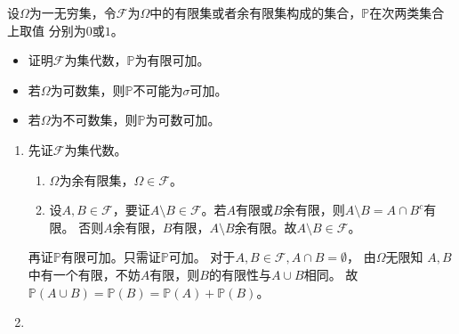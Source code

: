 \documentclass{ctexart}
\begin{document}
\begin{problem}
  设\(\Omega \)为一无穷集，令\(\mathcal{F} \)为\(\Omega \)中的有限集或者余有限集构成的集合，\(\mathbb{P} \)在次两类集合上取值
  分别为\(0 \)或\(1 \)。
  \begin{itemize}
    \item 证明\(\mathcal{F} \)为集代数，\(\mathbb{P} \)为有限可加。
    \item 若\(\Omega \)为可数集，则\(\mathbb{P} \)不可能为\(\sigma \)可加。
    \item 若\(\Omega \)为不可数集，则\(\mathbb{P} \)为可数可加。
  \end{itemize}

\end{problem}
\begin{solution}
  \begin{enumerate}
    \item
      先证\(\mathcal{F} \)为集代数。
      \begin{enumerate}
        \item \(\Omega \)为余有限集，\(\Omega \in \mathcal{F} \)。
        \item 设\(A,B \in \mathcal{F} \)，要证\(A \setminus B \in \mathcal{F} \)。若\(A \)有限或\(B \)余有限，则\(A \setminus B = A \cap B^c \)有限。
          否则\(A \)余有限，\(B \)有限，\(A \setminus B \)余有限。故\(A \setminus B \in \mathcal{F} \)。
      \end{enumerate}
      再证\(\mathbb{P}\)有限可加。只需证\(\mathbb{P} \)可加。
      对于\(A,B \in \mathcal{F},A \cap B = \emptyset \)，
      由\(\Omega \)无限知 \(A,B \)中有一个有限，不妨\(A \)有限，则\(B \)的有限性与\(A \cup B \)相同。
      故\(\mathbb{P}(A \cup B)=\mathbb{P}(B)=\mathbb{P}(A)+\mathbb{P}(B) \)。
    \item
  \end{enumerate}

\end{solution}
\end{document}

